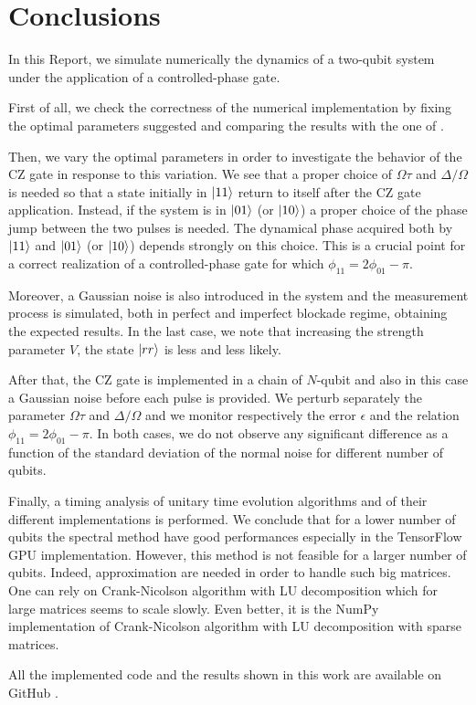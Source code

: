 \documentclass[rmp,10pt,onecolumn,fleqn,notitlepage]{revtex4-1}
\begin{document}
\clearpage

\section{Conclusions}
\label{sec:conclusions}

In this Report, we simulate numerically the dynamics of a two-qubit system under the application of a controlled-phase gate. 

First of all, we check the correctness of the numerical implementation by fixing the optimal parameters suggested and comparing the results with the one of \cite{PhysRevLett.123.170503}. 

Then, we vary the optimal parameters in order to investigate the behavior of the CZ gate in response to this variation. We see that a proper choice of $\Omega\tau$ and $\Delta/\Omega$ is needed so that a state initially in $\left\vert{11}\right\rangle$ return to itself after the CZ gate application. Instead, if the system is in $\left\vert{01}\right\rangle$ (or $\left\vert{10}\right\rangle$) a proper choice of the phase jump between the two pulses is needed. The dynamical phase acquired both by $\left\vert{11}\right\rangle$ and $\left\vert{01}\right\rangle$ (or $\left\vert{10}\right\rangle$) depends strongly on this choice. This is a crucial point for a correct realization of a controlled-phase gate for which $\phi_{11}=2\phi_{01}-\pi$.

Moreover, a Gaussian noise is also introduced in the system and the measurement process is simulated, both in perfect and imperfect blockade regime, obtaining the expected results. In the last case, we note that increasing the strength parameter $V$, the state $\left\vert{rr}\right\rangle$ is less and less likely.

After that, the CZ gate is implemented in a chain of $N$-qubit and also in this case a Gaussian noise before each pulse is provided. We perturb separately the parameter $\Omega\tau$ and $\Delta/\Omega$ and we monitor respectively the error $\epsilon$ and the relation $\phi_{11}=2\phi_{01}-\pi$.
In both cases, we do not observe any significant difference as a function of the standard deviation of the normal noise for different number of qubits.

Finally, a timing analysis of unitary time evolution algorithms and of their different implementations is performed. We conclude that for a lower number of qubits the spectral method have good performances especially in the TensorFlow GPU implementation. However, this method is not feasible for a larger number of qubits. Indeed, approximation are needed in order to handle such big matrices. One can rely on Crank-Nicolson algorithm with LU decomposition which for large matrices seems to scale slowly. Even better, it is the NumPy implementation of Crank-Nicolson algorithm with LU decomposition with sparse matrices.

All the implemented code and the results shown in this work are available on GitHub \cite{github}.


{}
\end{document}

